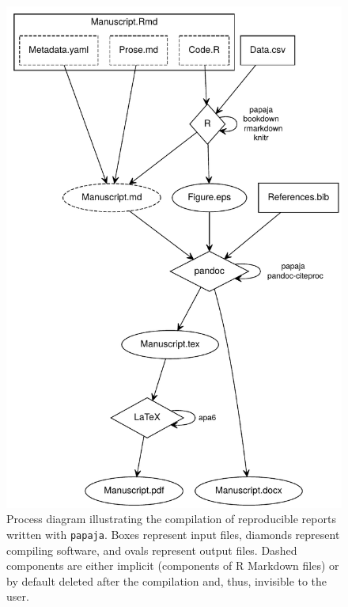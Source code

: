 \documentclass[man,floatsintext]{apa6}
\theoremstyle{definition}
\theoremstyle{definition}
\theoremstyle{definition}
\theoremstyle{remark}
\begin{document}
\begin{figure}

{\centering \includegraphics{paper_files/figure-latex/compilation-process-diagram} 

}

\caption{Process diagram illustrating the
compilation of reproducible reports written with \texttt{papaja}. Boxes
represent input files, diamonds represent compiling software, and ovals
represent output files. Dashed components are either implicit
(components of R Markdown files) or by default deleted after the
compilation and, thus, invisible to the user.}\label{fig:compilation-process-diagram}
\end{figure}
\end{document}
